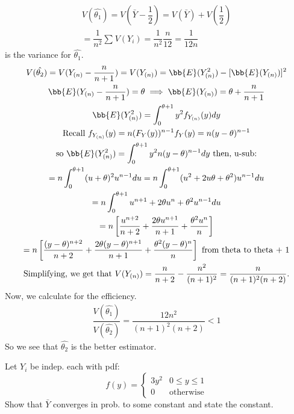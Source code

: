 \documentclass{article}
\begin{document}
\begin{soln}
    \begin{gather*}
        V(\hat{\theta_{1}}) = V(\bar{Y} - \dfrac{1}{2}) = V(\bar{Y}) + V(\dfrac{1}{2}) \\
        = \dfrac{1}{n^{2}} \sum_{}^{} {V(Y_{i})} = \dfrac{1}{n^{2}} \dfrac{n}{12} = \dfrac{1}{12n}
    \end{gather*}
    is the variance for $ \hat{\theta_{1}} $.
    \begin{gather*}
        V(\hat{\theta_{2}}) = V(Y_{(n)} - \dfrac{n}{n+1}) = V(Y_{(n)}) = \bb{E}(Y_{(n)}^{2}) - [\bb{E}(Y_{(n)})]^{2} \\
        \bb{E}(Y_{(n)} - \dfrac{n}{n + 1}) = \theta \implies \bb{E}(Y_{(n)}) = \theta + \dfrac{n}{n + 1} \\
        \bb{E}(Y_{(n)}^{2}) = \int_{0}^{\theta + 1} y^{2}f_{Y_{(n)}}(y) dy \\
        \textrm{Recall } f_{Y_{(n)}}(y) = n(F_{Y}(y))^{n-1}f_{Y}(y) = n(y-\theta)^{n-1} \\
        \textrm{so } \bb{E}(Y_{(n)}^{2}) = \int_{0}^{\theta+1}y^{2}n(y-\theta)^{n-1}dy \textrm{ then, u-sub:} \\
        = n\int_{0}^{\theta+1}(u+\theta)^{2}u^{n-1}du = n\int_{0}^{\theta+1}(u^{2}+2u\theta+\theta^{2})u^{n-1}du \\
        = n\int_{0}^{\theta+1} u^{n+1}+2\theta u^{n}+\theta^{2}u^{n-1}du \\
        = n\left[ \dfrac{u^{n+2}}{n+2} + \dfrac{2\theta u^{n+1}}{n+1} + \dfrac{\theta^{2}u^{n}}{n} \right] \\
        = n\left[ \dfrac{(y-\theta)^{n+2}}{n+2} + \dfrac{2\theta(y-\theta)^{n+1}}{n+1} + \dfrac{\theta^{2}(y-\theta)^{n}}{n} \right] \textrm{ from theta to theta + 1} \\
        \textrm{Simplifying, we get that } V(Y_{(n)}) = \dfrac{n}{n+2}-\dfrac{n^{2}}{(n+1)^{2}} = \dfrac{n}{(n+1)^{2}(n+2)}.
    \end{gather*}
    Now, we calculate for the efficiency.
    \begin{gather*}
        \dfrac{V(\hat{\theta_{1}})}{V(\hat{\theta_{2}})} = \dfrac{12n^{2}}{(n+1)^{2}(n+2)} < 1
    \end{gather*}
    So we see that $ \hat{\theta_{2}} $ is the better estimator.
\end{soln}

\begin{qu}
Let $ Y_{i} $ be indep. each with pdf:
\begin{equation*}
    f(y) = \begin{cases} 3y^{2} & 0 \leq y \leq 1 \\ 0 & \textrm{otherwise} \end{cases}
\end{equation*}
Show that $ \bar{Y} $ converges in prob. to some constant and state the constant.
\end{qu}
\end{document}
